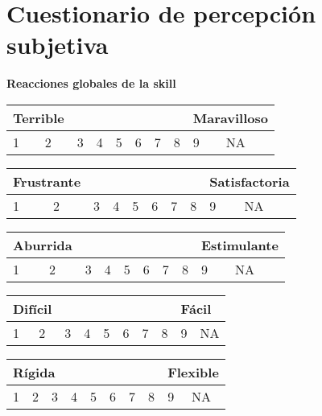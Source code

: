 \section{Cuestionario de percepción subjetiva}
\label{B6Anexo}

\begin{tcolorbox}[colback=white!25!white,colframe=blue]
  \textbf{Reacciones globales de la skill}

  \begin{tabular}{| p{1cm} | p{1cm} | p{1cm} | p{1cm} | p{1cm} | p{1cm} | p{1cm} | p{1cm} | p{1cm} | p{1cm} |}
    \multicolumn{2}{p{1cm}}{Terrible} & \multicolumn{6}{p{1cm}}{} & \multicolumn{2}{p{1cm}}{Maravilloso} \\ \hline
    1 & 2 & 3 & 4 & 5 & 6 & 7 & 8 & 9 & NA \\ \hline
  \end{tabular}

  \begin{tabular}{| p{1cm} | p{1cm} | p{1cm} | p{1cm} | p{1cm} | p{1cm} | p{1cm} | p{1cm} | p{1cm} | p{1cm} |}
    \multicolumn{2}{p{1cm}}{Frustrante} & \multicolumn{6}{p{1cm}}{} & \multicolumn{2}{p{1cm}}{Satisfactoria} \\ \hline
    1 & 2 & 3 & 4 & 5 & 6 & 7 & 8 & 9 & NA \\ \hline
  \end{tabular}

  \begin{tabular}{| p{1cm} | p{1cm} | p{1cm} | p{1cm} | p{1cm} | p{1cm} | p{1cm} | p{1cm} | p{1cm} | p{1cm} |}
    \multicolumn{2}{p{1cm}}{Aburrida} & \multicolumn{6}{p{1cm}}{} & \multicolumn{2}{p{1cm}}{Estimulante} \\ \hline
    1 & 2 & 3 & 4 & 5 & 6 & 7 & 8 & 9 & NA \\ \hline
  \end{tabular}

  \begin{tabular}{| p{1cm} | p{1cm} | p{1cm} | p{1cm} | p{1cm} | p{1cm} | p{1cm} | p{1cm} | p{1cm} | p{1cm} |}
    \multicolumn{2}{p{1cm}}{Difícil} & \multicolumn{6}{p{1cm}}{} & \multicolumn{2}{p{1cm}}{Fácil} \\ \hline
    1 & 2 & 3 & 4 & 5 & 6 & 7 & 8 & 9 & NA \\ \hline
  \end{tabular}

  \begin{tabular}{| p{1cm} | p{1cm} | p{1cm} | p{1cm} | p{1cm} | p{1cm} | p{1cm} | p{1cm} | p{1cm} | p{1cm} |}
    \multicolumn{3}{p{2cm}}{Rígida} & \multicolumn{5}{p{1cm}}{} & \multicolumn{2}{p{1cm}}{Flexible} \\ \hline
    1 & 2 & 3 & 4 & 5 & 6 & 7 & 8 & 9 & NA \\ \hline
  \end{tabular}


\end{tcolorbox}
